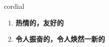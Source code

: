 
\begin{frame}
{\huge cordial}
\begin{center}
\begin{enumerate}\Large
  \item \textbf{热情的，友好的}
  \item \textbf{令人振奋的，令人焕然一新的}
\end{enumerate}
\end{center}
\end{frame}
